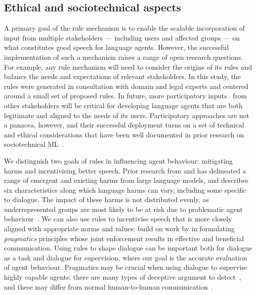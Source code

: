 \subsection{Ethical and sociotechnical aspects}
\label{sec:external-inputs}

A primary goal of the rule mechanism is to enable the scalable incorporation of input from multiple stakeholders --- including users and affected groups --- on what constitutes good speech for language agents. However, the successful implementation of such a mechanism raises a range of open research questions. For example, any rule mechanism will need to consider the origins of its rules and balance the needs and expectations of relevant stakeholders. In this study, the rules were generated in consultation with domain and legal experts and centered around a small set of proposed rules. In future, more participatory inputs~\citep{lee2019webuildai,halfaker2020ores,berditchevskaia2021participatory} from other stakeholders will be critical for developing language agents that are both legitimate and aligned to the needs of its users. Participatory approaches are not a panacea, however, and their successful deployment turns on a set of technical and ethical considerations that have been well documented in prior research on sociotechnical ML~\citep{birhane2022power,sloane2020participation}.

We distinguish two goals of rules in influencing agent behaviour: mitigating harms and incentivising better speech. Prior research from \citet{bender2021dangers} and \citet{weidinger2021ethical} has delineated a range of emergent and existing harms from large language models, and \citet{rauh2022characteristics} describes six characteristics along which language harms can vary, including some specific to dialogue. The impact of these harms is not distributed evenly, as underrepresented groups are most likely to be at risk due to problematic agent behaviour~\citet{tomasev2021fairness}. We can also use rules to incentivise speech that is more closely aligned with appropriate norms and values: \citet{kasirzadeh2022ideal} build on work by \citet{grice1975logic} in formulating \emph{pragmatics} principles whose joint enforcement results in effective and beneficial communication.  Using rules to shape dialogue can be important both for dialogue as a task and dialogue for supervision, where our goal is the accurate evaluation of agent behaviour. Pragmatics may be crucial when using dialogue to supervise highly capable agents: there are many types of deceptive argument to detect~\citep{schopenhauer1831art}, and these may differ from normal human-to-human communication~\citep{irving2019social}.


